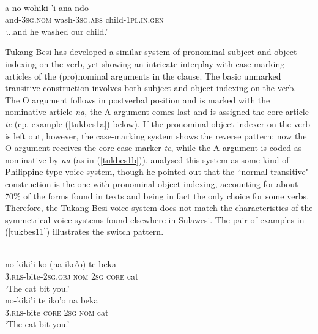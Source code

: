 \ea \label{tolaki1}
\\
\gll a-no wohiki-'i ana-ndo \\
and-\textsc{3}\textsc{sg}.\textsc{nom} wash-\textsc{3}\textsc{sg}.\textsc{abs} child-\textsc{1}\textsc{pl}.\textsc{in}.\textsc{gen} \\
\glft `...and he washed our child.'\\ 
\z

Tukang Besi has developed a similar system of pronominal subject and object indexing on the verb, yet showing an intricate interplay with case-marking articles of the (pro)nominal arguments in the clause. The basic unmarked transitive construction involves both subject and object indexing on the verb. The O argument follows in postverbal position and is marked with the nominative article \textit{na}, the A argument comes last and is assigned the core article \textit{te} (cp. example (\ref{tukbes1a}) below). If the pronominal object indexer on the verb is left out, however, the case-marking system shows the reverse pattern: now the O argument receives the core case marker \textit{te}, while the A argument is coded as nominative by \textit{na} (as in (\ref{tukbes1b})). \citet[53]{donohue1999} analysed this system as some kind of Philippine-type voice system, though he pointed out that the ``normal transitive" construction is the one with pronominal object indexing, accounting for about 70\% of the forms found in texts and being in fact the only choice for some verbs. Therefore, the Tukang Besi voice system does not match the characteristics of the symmetrical voice systems found elsewhere in Sulawesi. The pair of examples in (\ref{tukbes11}) illustrates the switch pattern.

\ea \label{tukbes11} 
\\
\ea \label{tukbes1a}
\gll no-kiki'i-ko (na iko'o) te beka \\
\textsc{3}.\textsc{rls}-bite-\textsc{2}\textsc{sg}.\textsc{obj} \textsc{nom} \textsc{2}\textsc{sg} \textsc{core} cat \\
\glft `The cat bit you.' \\ 
\ex \label{tukbes1b}
\gla no-kiki'i te iko'o na beka \\ 
\textsc{3}.\textsc{rls}-bite \textsc{core} \textsc{2}\textsc{sg} \textsc{nom} cat \\
\glft `The cat bit you.'\\ 
\z
\z

